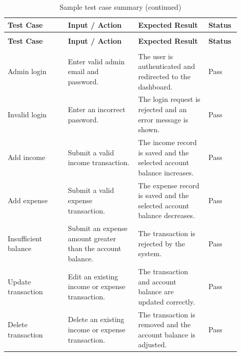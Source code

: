 ﻿\documentclass{article}
\begin{document}
\small
\renewcommand{\arraystretch}{1.2}

\begin{longtable}{
    >{\raggedright\arraybackslash}p{0.24\linewidth}
    J{0.28\linewidth}
    J{0.28\linewidth}
    >{\centering\arraybackslash}p{0.10\linewidth}
}
\caption{Sample test case summary}
\label{tab:test-cases} \\

\toprule
\textbf{Test Case} & \textbf{Input / Action} & \textbf{Expected Result} & \textbf{Status} \\
\midrule
\endfirsthead

\caption[]{Sample test case summary (continued)} \\

\toprule
\textbf{Test Case} & \textbf{Input / Action} & \textbf{Expected Result} & \textbf{Status} \\
\midrule
\endhead

\midrule
{} \\
\endfoot

\bottomrule
\endlastfoot

Admin login 
& Enter valid admin email and password. 
& The user is authenticated and redirected to the dashboard. 
& Pass \\

Invalid login 
& Enter an incorrect password. 
& The login request is rejected and an error message is shown. 
& Pass \\

Add income 
& Submit a valid income transaction. 
& The income record is saved and the selected account balance increases. 
& Pass \\

Add expense 
& Submit a valid expense transaction. 
& The expense record is saved and the selected account balance decreases. 
& Pass \\

Insufficient balance 
& Submit an expense amount greater than the account balance. 
& The transaction is rejected by the system. 
& Pass \\

Update transaction 
& Edit an existing income or expense transaction. 
& The transaction and account balance are updated correctly. 
& Pass \\

Delete transaction 
& Delete an existing income or expense transaction. 
& The transaction is removed and the account balance is adjusted. 
& Pass \\


\end{longtable}
\end{document}
